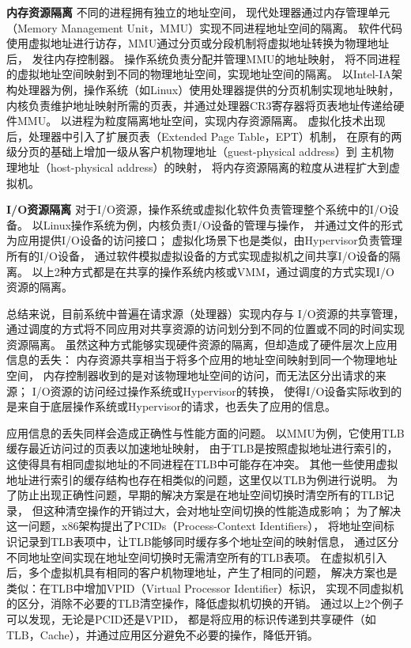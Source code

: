 \textbf{内存资源隔离}\quad	%
不同的进程拥有独立的地址空间，
现代处理器通过内存管理单元（Memory Management Unit，MMU）实现不同进程地址空间的隔离。
软件代码使用虚拟地址进行访存，MMU通过分页或分段机制将虚拟地址转换为物理地址后，
发往内存控制器。
操作系统负责分配并管理MMU的地址映射，
将不同进程的虚拟地址空间映射到不同的物理地址空间，实现地址空间的隔离。
以Intel-IA架构处理器为例，操作系统（如Linux）使用处理器提供的分页机制实现地址映射，
内核负责维护地址映射所需的页表，并通过处理器CR3寄存器将页表地址传递给硬件MMU。
以进程为粒度隔离地址空间，实现内存资源隔离。
虚拟化技术出现后，处理器中引入了扩展页表（Extended Page Table，EPT）机制，
在原有的两级分页的基础上增加一级从客户机物理地址（guest-physical address）到
主机物理地址（host-physical address）的映射，
将内存资源隔离的粒度从进程扩大到虚拟机。

\textbf{I/O资源隔离}\quad	%
对于I/O资源，操作系统或虚拟化软件负责管理整个系统中的I/O设备。
以Linux操作系统为例，内核负责I/O设备的管理与操作，
并通过文件的形式为应用提供I/O设备的访问接口；
虚拟化场景下也是类似，由Hypervisor负责管理所有的I/O设备，
通过软件模拟虚拟设备的方式实现虚拟机之间共享I/O设备的隔离。
以上2种方式都是在共享的操作系统内核或VMM，通过调度的方式实现I/O资源的隔离。

总结来说，目前系统中普遍在请求源（处理器）实现内存与 I/O资源的共享管理，
通过调度的方式将不同应用对共享资源的访问划分到不同的位置或不同的时间实现资源隔离。
虽然这种方式能够实现硬件资源的隔离，但却造成了硬件层次上应用信息的丢失：
内存资源共享相当于将多个应用的地址空间映射到同一个物理地址空间，
内存控制器收到的是对该物理地址空间的访问，而无法区分出请求的来源；
I/O资源的访问经过操作系统或Hypervisor的转换，
使得I/O设备实际收到的是来自于底层操作系统或Hypervisor的请求，也丢失了应用的信息。

应用信息的丢失同样会造成正确性与性能方面的问题。
以MMU为例，它使用TLB缓存最近访问过的页表以加速地址映射，
由于TLB是按照虚拟地址进行索引的，这使得具有相同虚拟地址的不同进程在TLB中可能存在冲突。
其他一些使用虚拟地址进行索引的缓存结构也存在相类似的问题，这里仅以TLB为例进行说明。
为了防止出现正确性问题，早期的解决方案是在地址空间切换时清空所有的TLB记录，
但这种清空操作的开销过大，会对地址空间切换的性能造成影响；
为了解决这一问题，x86架构提出了PCIDs（Process-Context Identifiers），
将地址空间标识记录到TLB表项中，让TLB能够同时缓存多个地址空间的映射信息，
通过区分不同地址空间实现在地址空间切换时无需清空所有的TLB表项。
在虚拟机引入后，多个虚拟机具有相同的客户机物理地址，产生了相同的问题，
解决方案也是类似：在TLB中增加VPID（Virtual Processor Identifier）标识，
实现不同虚拟机的区分，消除不必要的TLB清空操作，降低虚拟机切换的开销。
通过以上2个例子可以发现，无论是PCID还是VPID，
都是将应用的标识传递到共享硬件（如TLB，Cache），并通过应用区分避免不必要的操作，降低开销。

